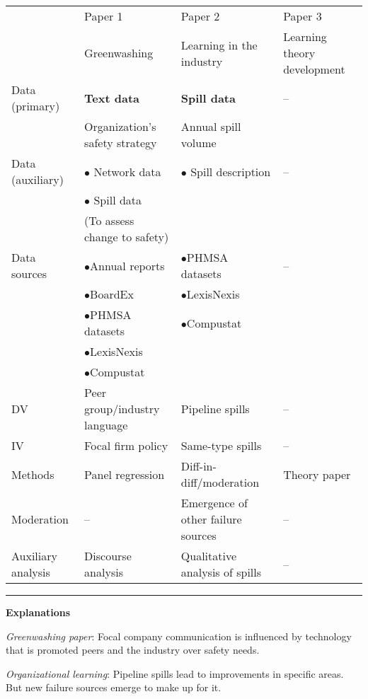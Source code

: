 \begin{frame}
	
	\tiny
	\begin{tabularx}{\textwidth}{l l l p{1.5cm}}
							&Paper 1 					&Paper 2 						&Paper 3 \\
							&Greenwashing 				&Learning in the industry		&Learning theory development \\
		\hline\hline
		Data (primary)		&\textbf{Text data}
										 				&\textbf{Spill data}			& --\\
							&Organization's safety strategy
														&Annual spill volume			& \\				
		Data (auxiliary)	&$\bullet$ Network data		&$\bullet$ Spill description	& --\\
							&$\bullet$ Spill data		& 								& \\
							&\hspace{\parindent} (To assess change to safety)
														&								& \\
		Data sources		&$\bullet$Annual reports	&$\bullet$PHMSA datasets		& --\\
							&$\bullet$BoardEx			&$\bullet$LexisNexis			& \\
							&$\bullet$PHMSA datasets	&$\bullet$Compustat				& \\
							&$\bullet$LexisNexis		&								& \\
							&$\bullet$Compustat			&								& \\
		DV					&Peer group/industry language
														&Pipeline spills				& --\\
		IV					&Focal firm policy			&Same-type spills				& --\\
		Methods				&Panel regression			&Diff-in-diff/moderation		&Theory paper \\
		Moderation			&--							&Emergence of other failure sources
																						& --\\
		
		Auxiliary analysis	&Discourse analysis			&Qualitative analysis of spills & --\\
	\end{tabularx}

	\vspace{0.1cm}
	\hrule
	\vspace{0.1cm}
	
	\textbf{Explanations}	
		
	\textit{Greenwashing paper}: Focal company communication is influenced by technology that is promoted peers and the industry over safety needs.
	
	\textit{Organizational learning}: Pipeline spills lead to improvements in specific areas. But new failure sources emerge to make up for it.
\end{frame}